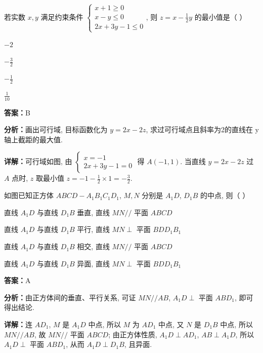 \begin{question}[points=4]
若实数 $x,y$ 满足约束条件 $\begin{cases} x+1 \geq 0 \\ x-y \leq 0 \\ 2x+3y-1 \leq 0 \end{cases}$, 则 $z = x - \frac{1}{2}y$ 的最小值是（   ）
\begin{choices}
  \item $-2$
  \item $-\frac{3}{2}$
  \item $-\frac{1}{2}$
  \item $\frac{1}{10}$
\end{choices}
\begin{solution}
\textbf{答案：}B

\textbf{分析：}画出可行域, 目标函数化为 $y=2x-2z$, 求过可行域点且斜率为2的直线在 y 轴上截距的最大值.

\textbf{详解：}可行域如图, 由 $\begin{cases} x=-1 \\ 2x+3y-1=0 \end{cases}$ 得 $A(-1,1)$. 当直线 $y=2x-2z$ 过 $A$ 点时, $z$ 取最小值 $z = -1 - \frac{1}{2}\times1 = -\frac{3}{2}$.
\end{solution}
\end{question}

\begin{question}[points=4]
如图已知正方体 $ABCD-A_1B_1C_1D_1$, $M,N$ 分别是 $A_1D$, $D_1B$ 的中点, 则（   ）
\begin{choices}
  \item 直线 $A_1D$ 与直线 $D_1B$ 垂直, 直线 $MN //$ 平面 $ABCD$
  \item 直线 $A_1D$ 与直线 $D_1B$ 平行, 直线 $MN \perp$ 平面 $BDD_1B_1$
  \item 直线 $A_1D$ 与直线 $D_1B$ 相交, 直线 $MN //$ 平面 $ABCD$
  \item 直线 $A_1D$ 与直线 $D_1B$ 异面, 直线 $MN \perp$ 平面 $BDD_1B_1$
\end{choices}
\begin{solution}
\textbf{答案：}A

\textbf{分析：}由正方体间的垂直、平行关系, 可证 $MN // AB$, $A_1D \perp$ 平面 $ABD_1$, 即可得出结论.

\textbf{详解：}连 $AD_1$, $M$ 是 $A_1D$ 中点, 所以 $M$ 为 $AD_1$ 中点, 又 $N$ 是 $D_1B$ 中点, 所以 $MN // AB$, 故 $MN //$ 平面 $ABCD$; 由正方体性质, $A_1D \perp AD_1$, $AB \perp A_1D$, 所以 $A_1D \perp$ 平面 $ABD_1$, 从而 $A_1D \perp D_1B$, 且异面.
\end{solution}
\end{question}

